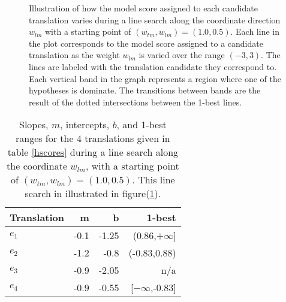 \documentclass[11pt]{article}
\begin{document}
\begin{figure}[h]
\vskip 0.2in
\begin{center}
\setlength{\epsfxsize}{3.0in}
\centerline{}
\vskip -0.15in
\caption{Illustration of how the model score assigned to each candidate translation varies during a line search along the coordinate direction \mbox{$w_{lm}$} with a starting point of \mbox{$(w_{tm}, w_{lm}) = (1.0, 0.5)$}. Each line in the plot corresponds to the model score assigned to a candidate translation as the weight \mbox{$w_{lm}$} is varied over the range \mbox{$(-3,3)$}.  The lines are labeled with the translation candidate they correspond to. Each vertical band in the graph represents a region where one of the hypotheses is dominate. The transitions between bands are the result of the dotted intersections between the 1-best lines.
\label{mertlinesearch}
}
\end{center}
\vskip -0.2in
\end{figure}

\begin{table}
\begin{center}
\begin{tabular}{|l|rrr|}
\hline \bf Translation  & \bf m  & \bf b & \bf 1-best  \\
\hline
\mbox{$e_1$}     & -0.1 & -1.25  & (0.86,\mbox{$+\infty$}] \\
\mbox{$e_2$}     & -1.2 & -0.8   & (-0.83,0.88) \\
\mbox{$e_3$}     & -0.9 & -2.05  & n/a \\
\mbox{$e_4$}     & -0.9 & -0.55  & [\mbox{$-\infty$},-0.83] \\
\hline
\end{tabular}
\end{center}
\caption{Slopes, \mbox{$m$}, intercepts, \mbox{$b$}, and 1-best ranges for the 4 translations given in table \ref{hscores} during a line search along the coordinate \mbox{$w_{lm}$}, with a starting point of \mbox{$(w_{tm}, w_{lm}) = (1.0, 0.5)$}. This line search in illustrated in figure(\ref{mertlinesearch}).
\label{hlinesearch}
}
\end{table}
\end{document}
